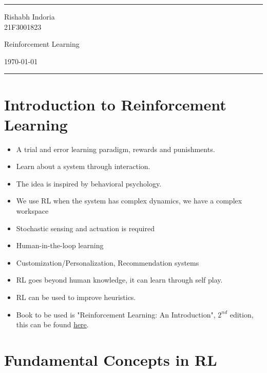 \documentclass[a4paper]{article}
\begin{document}
\fancyhead[c]{}
\hrule \medskip
\begin{minipage}{0.195\textwidth}
\raggedright
Rishabh Indoria\\
21F3001823
\end{minipage}
\begin{minipage}{0.6\textwidth}
\centering
\LARGE
Reinforcement Learning
\end{minipage}
\begin{minipage}{0.195\textwidth}
\raggedleft
\today \hfill \\
\end{minipage}
\medskip \hrule
\bigskip

\section{Introduction to Reinforcement Learning}
\begin{itemize}
    \item A trial and error learning paradigm, rewards and punishments.
    \item Learn about a system through interaction.
    \item The idea is inspired by behavioral psychology.
    \item We use RL when the system has complex dynamics, we have a complex workspace
    \item Stochastic sensing and actuation is required
    \item Human-in-the-loop learning
    \item Customization/Personalization, Recommendation systems
    \item RL goes beyond human knowledge, it can learn through self play.
    \item RL can be used to improve heuristics.
    \item Book to be used is "Reinforcement Learning: An Introduction", $2^{nd}$ edition, this can be found \href{https://www.andrew.cmu.edu/course/10-703/textbook/BartoSutton.pdf}{here}.\label{Book}
\end{itemize}

\section{Fundamental Concepts in RL}
\end{document}
